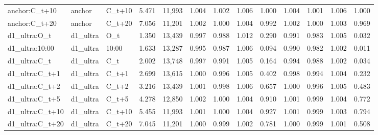 \begin{tabular}{lllllllllllll}
anchor:C\_t+10 & anchor & C\_t+10 & 5.471 & 11,993 & 1.004 & 1.002 & 1.006 & 1.000 & 1.004 & 1.001 & 1.006 & 1.000 \\
anchor:C\_t+20 & anchor & C\_t+20 & 7.056 & 11,201 & 1.002 & 1.000 & 1.004 & 0.992 & 1.002 & 1.000 & 1.003 & 0.969 \\
d1\_ultra:O\_t & d1\_ultra & O\_t & 1.350 & 13,439 & 0.997 & 0.988 & 1.012 & 0.290 & 0.991 & 0.983 & 1.005 & 0.032 \\
d1\_ultra:10:00 & d1\_ultra & 10:00 & 1.633 & 13,287 & 0.995 & 0.987 & 1.006 & 0.094 & 0.990 & 0.982 & 1.002 & 0.011 \\
d1\_ultra:C\_t & d1\_ultra & C\_t & 2.002 & 13,748 & 0.997 & 0.991 & 1.005 & 0.164 & 0.994 & 0.988 & 1.002 & 0.034 \\
d1\_ultra:C\_t+1 & d1\_ultra & C\_t+1 & 2.699 & 13,615 & 1.000 & 0.996 & 1.005 & 0.402 & 0.998 & 0.994 & 1.004 & 0.232 \\
d1\_ultra:C\_t+2 & d1\_ultra & C\_t+2 & 3.216 & 13,439 & 1.001 & 0.998 & 1.006 & 0.657 & 1.000 & 0.996 & 1.005 & 0.483 \\
d1\_ultra:C\_t+5 & d1\_ultra & C\_t+5 & 4.278 & 12,850 & 1.002 & 1.000 & 1.004 & 0.910 & 1.001 & 0.999 & 1.004 & 0.772 \\
d1\_ultra:C\_t+10 & d1\_ultra & C\_t+10 & 5.455 & 11,993 & 1.001 & 1.000 & 1.004 & 0.927 & 1.001 & 0.999 & 1.003 & 0.794 \\
d1\_ultra:C\_t+20 & d1\_ultra & C\_t+20 & 7.045 & 11,201 & 1.000 & 0.999 & 1.002 & 0.781 & 1.000 & 0.999 & 1.001 & 0.508 \\
\bottomrule
\end{tabular}
